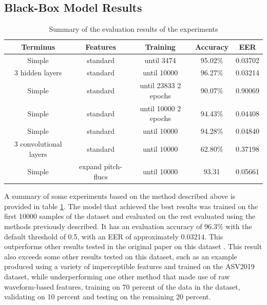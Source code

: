 \documentclass{article}
\begin{document}
		\subsection{Black-Box Model Results}
		\begin{table}[htbp]
			\centering\scriptsize
			\begin{tabular}{c | c | c | c | c}
				Terminus & Features & Training & Accuracy & EER \\
				\hline
				Simple & standard & until 3474 & 95.02\% & 0.03702 \\
				3 hidden layers & standard & until 10000 & 96.27\% & 0.03214 \\
				Simple & standard & until 23833 2 epochs & 90.07\% & 0.90069 \\
				Simple & standard & until 10000 2 epochs & 94.43\% & 0.04408 \\
				Simple & standard & until 10000 & 94.28\% & 0.04840 \\
				3 convolutional layers & standard & until 10000 & 62.80\% & 0.37198 \\
				Simple & expand pitch-flucs & until 10000 & 93.31 & 0.05661
			\end{tabular}
			\caption{Summary of the evaluation results of the experiments}
			\label{table:eval-results}
		\end{table}
		\sloppy
		A summary of some experiments based on the method described above is provided in table
		\ref{table:eval-results}. The model that achieved the best results was trained on the
		first 10000 samples of the dataset and evaluated on the rest evaluated using the methods
		previously described. It has an evaluation accuracy of 96.3\% with the default threshold of
		0.5, with an EER of approximately 0.03214. This outperforms other results tested in the
		original paper on this dataset \cite{muller_does_2022}. This result also exceeds some
		other results tested on this dataset, such as an example \cite{yang_robust_2024} produced
		using a variety of imperceptible features and trained on the ASV2019 dataset, while
		underperforming one other method \cite{ranjan_statnet_2022} that made use of raw
		waveform-based features, training on 70 percent of the data in the dataset, validating on
		10 percent and testing on the remaining 20 percent.
\end{document}
